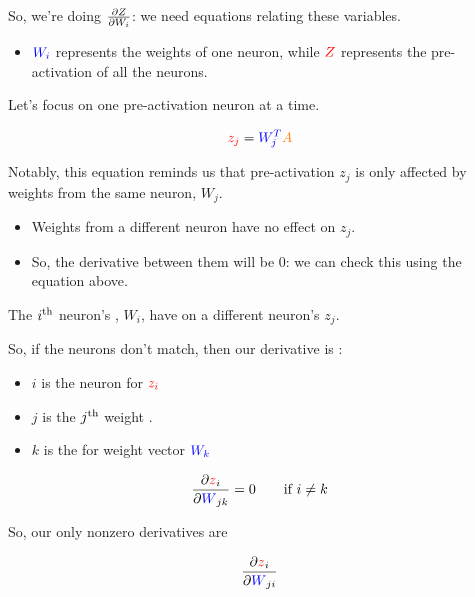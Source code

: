         So, we're doing $\frac{\partial Z}{\partial W_i}$: we need equations relating these variables.

        \begin{itemize}
            \item $\textcolor{blue}{W_i}$ represents the weights of one neuron, while $\textcolor{red}{Z}$ represents the pre-activation of all the neurons.
        \end{itemize}

        Let's focus on one pre-activation neuron at a time.
        
        \begin{equation}
            \textcolor{red}{z_j} = \textcolor{blue}{W_j^T}\textcolor{orange}{A}
        \end{equation}

        Notably, this equation reminds us that pre-activation $z_j$ is only affected by weights from the same neuron, $W_j$. 

        \begin{itemize}
            \item Weights from a different neuron have no effect on $z_j$.
            \item So, the derivative between them will be 0: we can check this using the equation above.
        \end{itemize}
        
        
        \begin{concept}
            The $i^{ \text{th} }$ neuron's , $W_i$, have  on a different neuron's  $z_j$.
            
            So, if the neurons don't match, then our derivative is :
            
            \begin{itemize}
                \item $i$ is the neuron for  $\textcolor{red}{z_i}$

                \item $j$ is the $j^{ \text{th} }$ weight .
                \item $k$ is the  for weight vector $\textcolor{blue}{W_k}$
            \end{itemize}
            
            \begin{equation*}
                \frac{\partial  \textcolor{red}{z}_i }{\partial  \textcolor{blue}{W}_{jk} } = 0 
                \qquad
                \text{if } i \neq k
            \end{equation*}
            
            So, our only nonzero derivatives are
            
            \begin{equation*}
                \frac{\partial  \textcolor{red}{z}_i }{\partial  \textcolor{blue}{W}_{ji} }
            \end{equation*}
        \end{concept}
        

